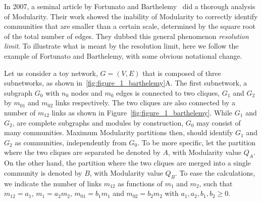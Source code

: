 In 2007, a seminal article by Fortunato and Barthelemy~\cite{fortunato2007} did a thorough analysis of Modularity.
Their work showed the inability of Modularity to correctly identify communities that are smaller than a certain scale, determined by the square root of the total number of edges. They dubbed this general phenomenon \emph{resolution limit}.
To illustrate what is meant by the resolution limit, here we follow the example of Fortunato and Barthelemy, with some obvious notational change.

Let us consider a toy network, $G=(V, E)$ that is composed of three subnetworks, as shown in~\ref{fig:figure_1_barthelemy}A.
The first subnetwork, a subgraph $G_0$ with $n_0$ nodes and $m_0$ edges is connected to two cliques, $G_1$ and $G_2$ by $m_{01}$ and $m_{02}$ links respectively.
The two cliques are also connected by a number of $m_{12}$ links as shown in Figure~\ref{fig:figure_1_barthelemy}.
While $G_1$ and $G_2$, are complete subgraphs and modules by construction, $G_0$ may consist of many communities.
Maximum Modularity partitions then, should identify $G_1$ and $G_2$ as communities, independently from $G_0$.
To be more specific, let the partition where the two cliques are separated be denoted by $A$, with Modularity value $Q_A$.
On the other hand, the partition where the two cliques are merged into a single community is denoted by $B$, with Modularity value $Q_B$.
To ease the calculations, we indicate the number of links $m_{12}$ as functions of $m_1$ and $m_2$, such that $m_{12}=a_{1}$, $m_1=a_2 m_2$, $m_{01}=b_1 m_1$ and $m_{02}=b_2 m_2$ with $a_1,a_2,b_1,b_2 \geq 0$.

